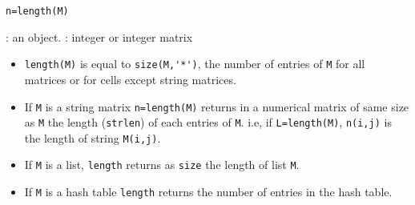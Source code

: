 
\begin{mandesc}
\end{mandesc}
\begin{calling_sequence}
\begin{verbatim}
n=length(M)   
\end{verbatim}
\end{calling_sequence}

\begin{parameters}
  \begin{varlist}
     : an object.
     : integer or integer matrix
  \end{varlist}
\end{parameters}

\begin{mandescription}
\begin{itemize}
  \item \verb!length(M)! is equal to \verb!size(M,'*')!, the number of entries of \verb!M! for all matrices 
    or for cells except string matrices.
  \item If \verb+M+ is a string matrix \verb+n=length(M)+ returns in a  numerical matrix of same size 
    as \verb+M+ the length (\verb+strlen+) of each entries of \verb+M+. i.e, if \verb+L=length(M)+, 
    \verb+n(i,j)+ is the length of string \verb+M(i,j)+.
  \item If \verb+M+ is a list, \verb+length+ returns as \verb+size+ the length of list \verb+M+.
  \item If \verb+M+ is a hash table \verb+length+ returns the number of entries in the hash table.
\end{itemize}
\end{mandescription}

\begin{examples}
  \begin{program}
  \end{program}
\end{examples}

\begin{manseealso}
\end{manseealso}

